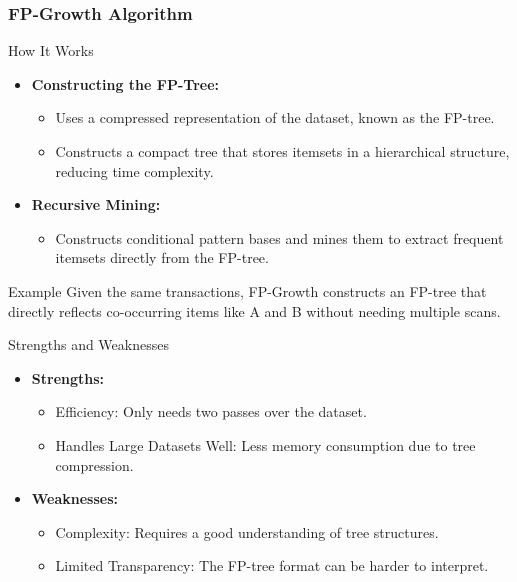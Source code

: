 \documentclass[aspectratio=169]{beamer}
\begin{document}
\begin{frame}[fragile]
    \frametitle{FP-Growth Algorithm}

    \begin{block}{How It Works}
        \begin{itemize}
            \item \textbf{Constructing the FP-Tree:}
            \begin{itemize}
                \item Uses a compressed representation of the dataset, known as the FP-tree.
                \item Constructs a compact tree that stores itemsets in a hierarchical structure, reducing time complexity.
            \end{itemize}
            \item \textbf{Recursive Mining:}
            \begin{itemize}
                \item Constructs conditional pattern bases and mines them to extract frequent itemsets directly from the FP-tree.
            \end{itemize}
        \end{itemize}
    \end{block}

    \begin{block}{Example}
        Given the same transactions, FP-Growth constructs an FP-tree that directly reflects co-occurring items like A and B without needing multiple scans.
    \end{block}

    \begin{block}{Strengths and Weaknesses}
        \begin{itemize}
            \item \textbf{Strengths:}
            \begin{itemize}
                \item Efficiency: Only needs two passes over the dataset.
                \item Handles Large Datasets Well: Less memory consumption due to tree compression.
            \end{itemize}
            \item \textbf{Weaknesses:}
            \begin{itemize}
                \item Complexity: Requires a good understanding of tree structures.
                \item Limited Transparency: The FP-tree format can be harder to interpret.
            \end{itemize}
        \end{itemize}
    \end{block}
\end{frame}
\end{document}
